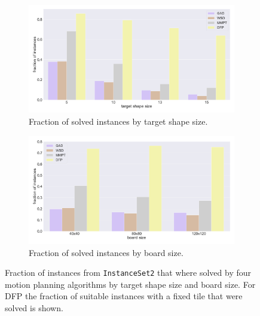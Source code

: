 \begin{figure}[htpb]
\begin{subfigure}[b]{\textwidth}
\centering
\includegraphics[width=\textwidth]{figures/plots/heuristic_solvers_i2/i2_fraction_solved_over_target_size.pdf}
\caption{Fraction of solved instances by target shape size.}
\label{fig:i2_fraction_solved_over_target_size}
\end{subfigure}
\begin{subfigure}[b]{\textwidth}
\centering
\includegraphics[width=\textwidth]{figures/plots/heuristic_solvers_i2/i2_fraction_solved_over_board_size.pdf}
\caption{Fraction of solved instances by board size.}
\label{fig:i2_fraction_solved_over_board_size}
\end{subfigure}
\caption [Fraction of \texttt{InstanceSet2} solved by several planners] {Fraction of instances from \texttt{InstanceSet2} that where solved by four motion planning algorithms by target shape size and board size. For DFP the fraction of suitable instances with a fixed tile that were solved is shown.}
\label{fig:i2_performance2}
\end{figure}
